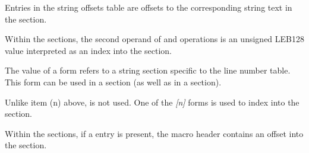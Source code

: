 \begin{description}
\bb
{}
Entries in the string offsets table are offsets to the corresponding string text
in the \dotdebugstrdwo{} section.


Within the \dotdebugmacrodwo{} sections, the second operand of \DWMACROdefinestrx{}
and \DWMACROundefstrx{} operations is an unsigned LEB128 value interpreted as an
index into the \dotdebugstroffsetsdwo{} section.
\db

\bb
{}
The value of a \DWFORMlinestrp{} form refers to a string section specific
to the line number table. This form can be used in a \dotdebugline{} section
(as well as in a \dotdebuginfo{} section).
\eb

\bb
{}
Unlike item (n) above, \DWFORMlinestrp{} is not used. One of the \DWFORMstrx\textit{[n]}
forms is used to index into the \dotdebugstroffsetsdwo{} section.
\eb

%

Within the \dotdebugmacrodwo{} sections, if a \DWMACROstartfile{} entry is present,
the macro header contains an offset into the \dotdebuglinedwo{} section.

\eb

\end{description}
